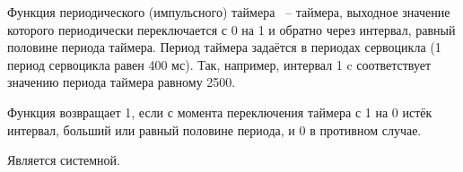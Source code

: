 Функция периодического (импульсного) таймера ~-- таймера, выходное значение которого периодически переключается с 0 на 1 и обратно через интервал, равный половине периода таймера. Период таймера задаётся в периодах сервоцикла (1 период сервоцикла равен 400 мс). Так, например, интервал 1 c соответствует значению периода таймера равному 2500. \killoverfullbefore

Функция возвращает 1, если с момента переключения таймера с 1 на 0 истёк интервал, больший или равный половине периода, и 0 в противном случае. \killoverfullbefore 

Является системной.

